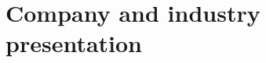\documentclass[../main/main.tex]{subfiles}
\begin{document}
  \section{Company and industry presentation}

  \Blindtext
\end{document}
